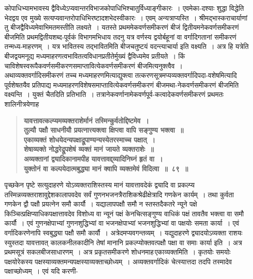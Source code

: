 \documentclass[11pt, openany]{book}
\begin{document}
\begin{sloppypar}
\noindent कोपाधिभ्यामभावस्य द्वैविध्येऽप्यवान्तरविभाजकोपाधिभिश्चातुर्विध्याङ्गीकारः~। एवमेका-दश्याः शुद्धा विद्धेति भेदद्वय एव मुख्ये सत्यप्यवान्तरोपाधिभिरष्टादशभेदस्वीकारः~। एवम् अन्यत्राप्यस्ति~। श्रीमद्भास्कराचार्याणां तु बीजद्वैविध्यमेवाभिमतमस्तीति लक्ष्यते~। यतस्ते प्रथममेकवर्णसमीकरणं बीजं द्वितीयमनेकवर्णसमीकरणं बीजमिति प्रथमद्वितीयशब्द-पूर्वकं विभागमभिधाय तदनु यत्र वर्णस्य द्वयोर्बहूनां वा वर्गादिगतानां समीकरणं तन्मध्य-माहरणम्~। यत्र भावितस्य तद्भावितमिति बीजचतुष्टयं वदन्त्याचार्या इति वक्ष्यति~। अत्र हि यत्रेति बीजद्वयमनूद्य मध्यमाहरणत्वभावितत्वविधानप्रतीतेर्मुख्यं द्वैविध्यमेव प्रतीयते~। किं चाविशेषस्वरूपैकवर्णसमीकरणसमाप्तावित्येकवर्णसमीकरणं बीजमित्यनुक्त्वैव~।\\

{\small अथाव्यक्तवर्गादिसमीकरणं तच्च मध्यमाहरणमित्याद्युक्त्वा तत्करणसूत्रमप्यव्यक्तवर्गादिपदा-वशेषमित्यादि पूर्वशेषतयैव प्रतिपाद्य मध्यमाहरणविशेषसमाप्तावित्येकवर्णसमीकरणं बीजमथा-नेकवर्णसमीकरणं बीजमिति वक्ष्यन्ति~। युक्तं चैतदिति प्रतिभाति~। तत्रानेकवर्णानामेकवर्णपूर्व-कत्वादेकवर्णसमीकरणं प्रथमतः शालिनीत्रयेणाह\textendash }

 \label{7.89}
\begin{quote}
{\large \textbf{{\color{purple}यावत्तावत्कल्प्यमव्यक्तराशेर्मानं तस्मिन्कुर्वतोद्दिष्टमेव~।\\
तुल्यौ पक्षौ साधनीयौ प्रयत्नात्त्यक्त्वा क्षिप्त्वा वापि सङ्गुण्य भक्त्वा~॥\\
एकाव्यक्तं शोधयेदन्यपक्षाद्रूपाण्यन्यस्येतरस्माच्च पक्षात्~।\\
शेषाव्यक्ते नोद्धरेद्रूपशेषं व्यक्तं मानं जायते व्यक्तराशेः~॥\\
अव्यक्तानां द्व्यादिकानामपीह यावत्तावद्द्व्यादिनिघ्नं हृतं वा~।\\
युक्तोनं वा कल्पयेदात्मबुद्ध्या मानं क्वापि व्यक्तमेवं विदित्वा~॥~८९~॥}}}
\end{quote}

पृच्छकेन पृष्टे सत्युदाहरणे योऽव्यक्तराशिस्तस्य मानं यावत्तावदेकं द्व्यादि वा प्रकल्प्य तस्मिन्नव्यक्तराशावुद्देशकालापवदेव सर्वं गुणनभजनत्रैराशिकश्रेढीक्षेत्रादि गणकेन कार्यम्~। तथा कुर्वता गणकेन द्वौ पक्षौ प्रयत्नेन समौ कार्यौ~। यद्यालापपक्षौ समौ न स्तस्तदैकतरे न्यूने पक्षे किञ्चित्प्रक्षिप्याधिकपक्षात्तावदेव विशोध्य वा न्यूनं पक्षं केनचित्सङ्गुण्य वाधिकं पक्षं तावतैव भक्त्वा वा समौ कार्यौ~। एवं गुणनक्षेपाभ्यां गुणनशुद्धिभ्यां वा भजनक्षेपाभ्यां भजनशुद्धिभ्यां वा पक्षयोः समता कार्या~। एवं वर्गादिकरणेनापि स्वबुद्ध्या पक्षौ समौ कार्यौ~। अत्रेदमप्यवगन्तव्यम्~। यद्युदाहरणे द्व्यादयोऽव्यक्ता राशयः स्युस्तदा यावत्तावत् कालकनीलकादीनि तेषां मानानि प्रकल्प्योक्तवत्पक्षौ पक्षा वा समाः कार्या इति~। अत्र प्रथमसूत्रं सकलबीजसाधारणम्~। अत्र प्रकृतसमीकरणे शोधनमाह\textendash \,एकाव्यक्तमिति~। कृतयोः समयोः पक्षयोरेकस्य पक्षस्याव्यक्तमन्यपक्षस्याव्यक्ताच्छोध्यम्~। अव्यक्तवर्गादिकं चेत्स्यात्तदा तदपि तस्मादेव पक्षाच्छोध्यम्~। एवं यदि करणी-
\end{sloppypar}
\end{document}
